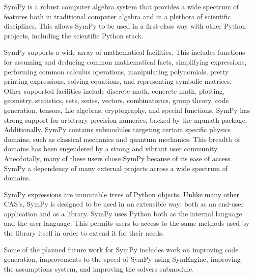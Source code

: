 SymPy is a robust computer algebra system that provides a wide spectrum of
features both in traditional computer algebra and in a plethora of scientific
disciplines. This allows SymPy to be used in a first-class way with other
Python projects, including the scientific Python stack.


SymPy supports a wide array of mathematical facilities. This includes
functions for assuming and deducing common mathematical facts,
simplifying expressions, performing common calculus operations, manipulating polynomials, pretty printing
expressions, solving equations, and representing symbolic matrices. Other supported
facilities
include discrete math, concrete math, plotting, geometry, statistics,
sets, series, vectors, combinatorics, group theory, code
generation, tensors, Lie algebras, cryptography, and special functions.
SymPy has strong support for arbitrary precision numerics, backed by the
mpmath package. Additionally, SymPy contains submodules targeting certain specific physics domains,
such as classical mechanics and quantum mechanics.  This breadth of domains has
been engendered by a strong and vibrant user community.
Anecdotally, many of these users chose SymPy because of its ease of access.
SymPy a dependency of many external projects across a wide
spectrum of domains.

SymPy expressions are immutable trees of Python objects. Unlike many other
CAS's, SymPy is designed to be used in an extensible way: both as an end-user
application and as a library. SymPy uses Python both as the internal language
and the user language. This permits users to access to the same methods used
by the library itself in order to extend it for their needs.


Some of the planned future work for SymPy includes work on improving code
generation, improvements to the speed of SymPy using SymEngine, improving the
assumptions system, and improving the solvers submodule.


